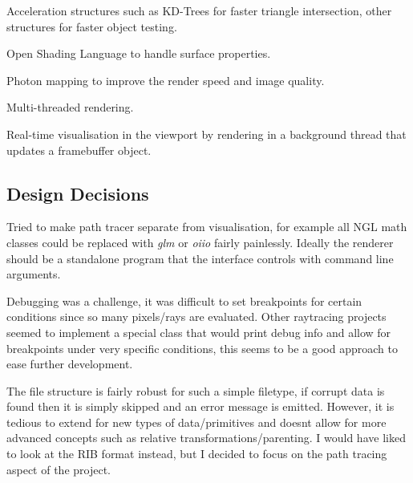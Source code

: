 \begin{DoxyItemize}
\item Acceleration structures such as K\+D-\/\+Trees for faster triangle intersection, other structures for faster object testing.
\item Open Shading Language to handle surface properties.
\item Photon mapping to improve the render speed and image quality.
\item Multi-\/threaded rendering.
\item Real-\/time visualisation in the viewport by rendering in a background thread that updates a framebuffer object.
\end{DoxyItemize}

\subsection*{Design Decisions}


\begin{DoxyItemize}
\item Tried to make path tracer separate from visualisation, for example all N\+G\+L math classes could be replaced with {\itshape glm} or {\itshape oiio} fairly painlessly. Ideally the renderer should be a standalone program that the interface controls with command line arguments.
\item Debugging was a challenge, it was difficult to set breakpoints for certain conditions since so many pixels/rays are evaluated. Other raytracing projects seemed to implement a special class that would print debug info and allow for breakpoints under very specific conditions, this seems to be a good approach to ease further development.
\item The file structure is fairly robust for such a simple filetype, if corrupt data is found then it is simply skipped and an error message is emitted. However, it is tedious to extend for new types of data/primitives and doesn\textquotesingle{}t allow for more advanced concepts such as relative transformations/parenting. I would have liked to look at the R\+I\+B format instead, but I decided to focus on the path tracing aspect of the project. 
\end{DoxyItemize}